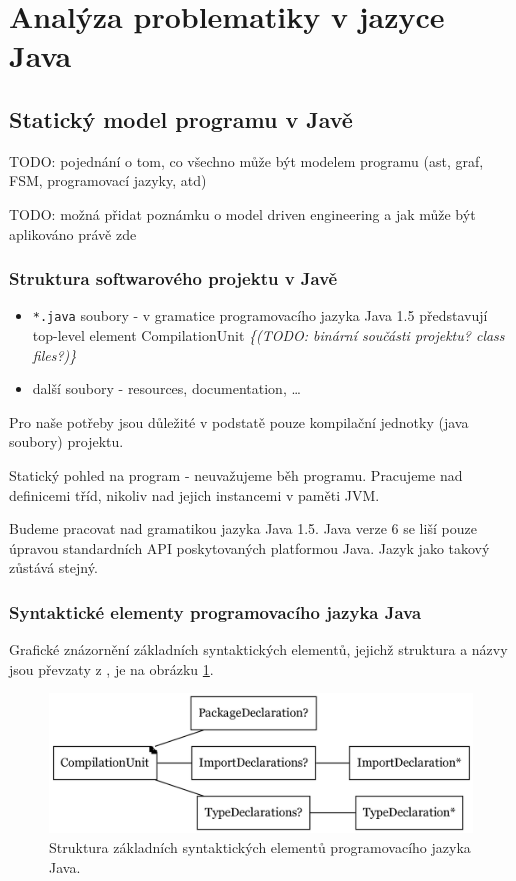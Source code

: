 \section{Analýza problematiky v jazyce Java}

\subsection{Statický model programu v Javě}
TODO: pojednání o tom, co všechno může být modelem programu (ast, graf, FSM, programovací jazyky, atd)

TODO: možná přidat poznámku o model driven engineering a jak může být aplikováno právě zde

\subsubsection{Struktura softwarového projektu v Javě}

\begin{itemize}
\item\verb+*.java+ soubory - v gramatice programovacího jazyka Java 1.5 představují top-level element CompilationUnit \emph{\{(TODO: binární součásti projektu? class files?)\}}
\item další soubory - resources, documentation, \ldots
\end{itemize}

Pro naše potřeby jsou důležité v podstatě pouze kompilační jednotky (java soubory) projektu.

Statický pohled na program - neuvažujeme běh programu. Pracujeme nad definicemi tříd, nikoliv nad jejich instancemi v paměti JVM.

Budeme pracovat nad gramatikou jazyka Java 1.5. Java verze 6 se liší pouze úpravou standardních API poskytovaných platformou Java. Jazyk jako takový zůstává stejný.

\subsubsection{Syntaktické elementy programovacího jazyka Java}
Grafické znázornění základních syntaktických elementů, jejichž struktura a názvy jsou převzaty z \cite{Gosling:2005:JLS:1036643}, je na obrázku \ref{toplevel_elements}.
\begin{figure}[h!]
  \centering
  \includegraphics[width=\textwidth]{./graphs/java_top_elements.png}
  \caption{Struktura základních syntaktických elementů programovacího jazyka Java.\label{toplevel_elements}}
\end{figure}

